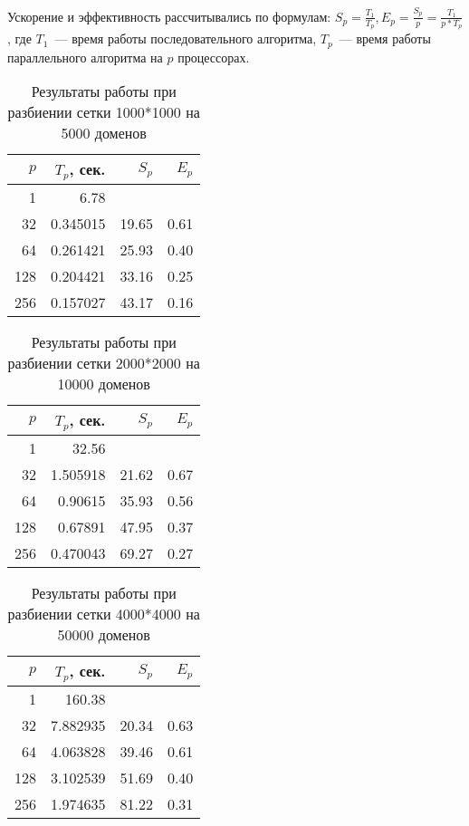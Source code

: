 \documentclass[oneside,final,14pt]{extreport}
\begin{document}
Ускорение и эффективность рассчитывались по формулам:
$S_p = \frac{T_1}{T_p}, E_p = \frac{S_p}{p} = \frac{T_1}{p * T_p}$, где
$T_1$~--- время работы последовательного алгоритма,
$T_p$~--- время работы параллельного алгоритма на $p$ процессорах.

\begin{table}[h]
\centering
\begin{tabular}{|r|r|r|r|}\hline
$p$    & $T_p$, сек. & $S_p$ & $E_p$ \\ \hline
1      & 6.78        &       &       \\ \hline
32     & 0.345015    & 19.65 & 0.61  \\ \hline
64     & 0.261421    & 25.93 & 0.40  \\ \hline
128    & 0.204421    & 33.16 & 0.25  \\ \hline
256    & 0.157027    & 43.17 & 0.16  \\ \hline
\end{tabular}
\caption{Результаты работы при разбиении сетки 1000*1000 на 5000 доменов}
\label{tab1000}
\end{table}

\begin{table}[h]
\centering
\begin{tabular}{|r|r|r|r|}\hline
$p$    & $T_p$, сек. & $S_p$ & $E_p$ \\ \hline
1      & 32.56       &       &       \\ \hline
32     & 1.505918    & 21.62 & 0.67  \\ \hline
64     & 0.90615     & 35.93 & 0.56  \\ \hline
128    & 0.67891     & 47.95 & 0.37  \\ \hline
256    & 0.470043    & 69.27 & 0.27  \\ \hline
\end{tabular}
\caption{Результаты работы при разбиении сетки 2000*2000 на 10000 доменов}
\label{tab2000}
\end{table}

\begin{table}[h]
\centering
\begin{tabular}{|r|r|r|r|}\hline
$p$    & $T_p$, сек. & $S_p$ & $E_p$ \\ \hline
1      & 160.38      &       &       \\ \hline
32     & 7.882935    & 20.34 & 0.63  \\ \hline
64     & 4.063828    & 39.46 & 0.61  \\ \hline
128    & 3.102539    & 51.69 & 0.40  \\ \hline
256    & 1.974635    & 81.22 & 0.31  \\ \hline
\end{tabular}
\caption{Результаты работы при разбиении сетки 4000*4000 на 50000 доменов}
\label{tab4000}
\end{table}
\end{document}
